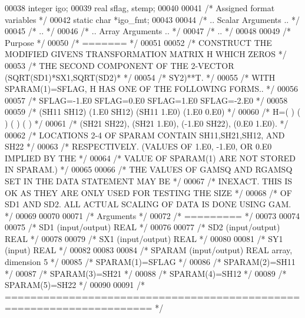 \begin{DoxyCode}
00038     integer igo;
00039     real sflag, stemp;
00040 
00041     \textcolor{comment}{/* Assigned format variables */}
00042     \textcolor{keyword}{static} \textcolor{keywordtype}{char} *igo\_fmt;
00043 
00044 \textcolor{comment}{/*     .. Scalar Arguments .. */}
00045 \textcolor{comment}{/*     .. */}
00046 \textcolor{comment}{/*     .. Array Arguments .. */}
00047 \textcolor{comment}{/*     .. */}
00048 
00049 \textcolor{comment}{/*  Purpose */}
00050 \textcolor{comment}{/*  ======= */}
00051 
00052 \textcolor{comment}{/*     CONSTRUCT THE MODIFIED GIVENS TRANSFORMATION MATRIX H WHICH ZEROS */}
00053 \textcolor{comment}{/*     THE SECOND COMPONENT OF THE 2-VECTOR  (SQRT(SD1)*SX1,SQRT(SD2)* */}
00054 \textcolor{comment}{/*     SY2)**T. */}
00055 \textcolor{comment}{/*     WITH SPARAM(1)=SFLAG, H HAS ONE OF THE FOLLOWING FORMS.. */}
00056 
00057 \textcolor{comment}{/*     SFLAG=-1.E0     SFLAG=0.E0        SFLAG=1.E0     SFLAG=-2.E0 */}
00058 
00059 \textcolor{comment}{/*       (SH11  SH12)    (1.E0  SH12)    (SH11  1.E0)    (1.E0  0.E0) */}
00060 \textcolor{comment}{/*     H=(          )    (          )    (          )    (          ) */}
00061 \textcolor{comment}{/*       (SH21  SH22),   (SH21  1.E0),   (-1.E0 SH22),   (0.E0  1.E0). */}
00062 \textcolor{comment}{/*     LOCATIONS 2-4 OF SPARAM CONTAIN SH11,SH21,SH12, AND SH22 */}
00063 \textcolor{comment}{/*     RESPECTIVELY. (VALUES OF 1.E0, -1.E0, OR 0.E0 IMPLIED BY THE */}
00064 \textcolor{comment}{/*     VALUE OF SPARAM(1) ARE NOT STORED IN SPARAM.) */}
00065 
00066 \textcolor{comment}{/*     THE VALUES OF GAMSQ AND RGAMSQ SET IN THE DATA STATEMENT MAY BE */}
00067 \textcolor{comment}{/*     INEXACT.  THIS IS OK AS THEY ARE ONLY USED FOR TESTING THE SIZE */}
00068 \textcolor{comment}{/*     OF SD1 AND SD2.  ALL ACTUAL SCALING OF DATA IS DONE USING GAM. */}
00069 
00070 
00071 \textcolor{comment}{/*  Arguments */}
00072 \textcolor{comment}{/*  ========= */}
00073 
00074 
00075 \textcolor{comment}{/*  SD1    (input/output) REAL */}
00076 
00077 \textcolor{comment}{/*  SD2    (input/output) REAL */}
00078 
00079 \textcolor{comment}{/*  SX1    (input/output) REAL */}
00080 
00081 \textcolor{comment}{/*  SY1    (input) REAL */}
00082 
00083 
00084 \textcolor{comment}{/*  SPARAM (input/output)  REAL array, dimension 5 */}
00085 \textcolor{comment}{/*     SPARAM(1)=SFLAG */}
00086 \textcolor{comment}{/*     SPARAM(2)=SH11 */}
00087 \textcolor{comment}{/*     SPARAM(3)=SH21 */}
00088 \textcolor{comment}{/*     SPARAM(4)=SH12 */}
00089 \textcolor{comment}{/*     SPARAM(5)=SH22 */}
00090 
00091 \textcolor{comment}{/*  ===================================================================== */}

\end{DoxyCode}
